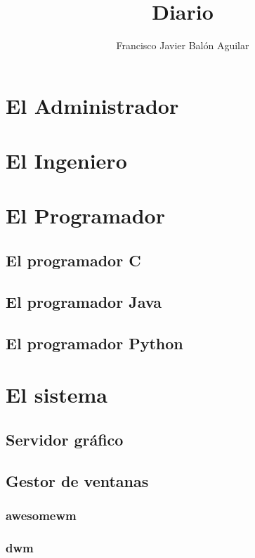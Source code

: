 \documentclass[a4paper, 11pt, titlepage]{book}
\title{Diario}
\author{Francisco Javier Balón Aguilar}
\begin{document}
\maketitle
\renewcommand{\contentsname}{Índice}
\tableofcontents
\newpage

\chapter{El Administrador}

\chapter{El Ingeniero}

\chapter{El Programador}

    \section{El programador C}
    
    \section{El programador Java}

    \section{El programador Python}

\chapter{El sistema}

    \section{Servidor gráfico}

    \section{Gestor de ventanas}

        \subsection{awesomewm}

        \subsection{dwm}
\end{document}

